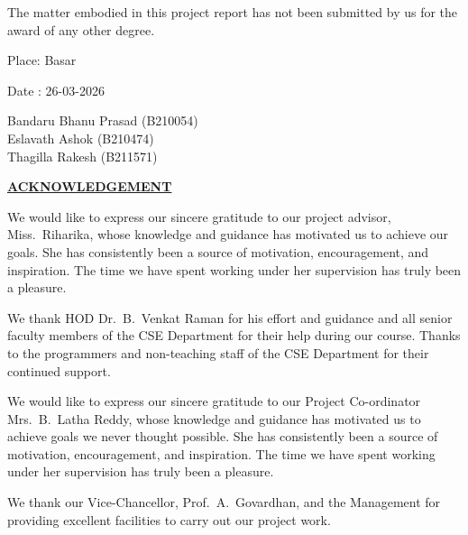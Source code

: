 \documentclass[12pt,a4paper]{report}
\begin{document}
\medskip
\noindent The matter embodied in this project report has not been submitted by us for the award of any other degree.

\vspace{1.5cm}
\noindent Place: Basar

\noindent Date : 26-03-2026

\vspace{1.5cm}
\begin{flushright}
Bandaru Bhanu Prasad (B210054)\\
Eslavath Ashok (B210474)\\
Thagilla Rakesh (B211571)
\end{flushright}

\newpage
\setcounter{page}{5}
\thispagestyle{fancy}

\begin{center}
{\large\textbf{\underline{ACKNOWLEDGEMENT}}}
\end{center}

\medskip
\noindent\hspace{1cm} We would like to express our sincere gratitude to our project advisor, Miss.\ Riharika, whose knowledge and guidance has motivated us to achieve our goals. She has consistently been a source of motivation, encouragement, and inspiration. The time we have spent working under her supervision has truly been a pleasure.

\medskip
\noindent\hspace{1cm} We thank HOD Dr.\ B.\ Venkat Raman for his effort and guidance and all senior faculty members of the CSE Department for their help during our course. Thanks to the programmers and non-teaching staff of the CSE Department for their continued support.

\medskip
\noindent\hspace{1cm} We would like to express our sincere gratitude to our Project Co-ordinator Mrs.\ B.\ Latha Reddy, whose knowledge and guidance has motivated us to achieve goals we never thought possible. She has consistently been a source of motivation, encouragement, and inspiration. The time we have spent working under her supervision has truly been a pleasure.

\medskip
\noindent\hspace{1cm} We thank our Vice-Chancellor, Prof.\ A.\ Govardhan, and the Management for providing excellent facilities to carry out our project work.
\end{document}
